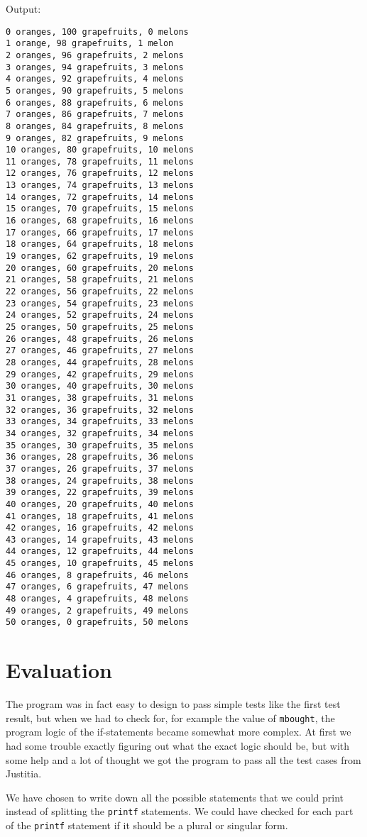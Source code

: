 \documentclass[a4paper,10pt]{article}
\begin{document}
\begin{itemize}
  Output:
\begin{lstlisting}[style = stdio]
0 oranges, 100 grapefruits, 0 melons
1 orange, 98 grapefruits, 1 melon
2 oranges, 96 grapefruits, 2 melons
3 oranges, 94 grapefruits, 3 melons
4 oranges, 92 grapefruits, 4 melons
5 oranges, 90 grapefruits, 5 melons
6 oranges, 88 grapefruits, 6 melons
7 oranges, 86 grapefruits, 7 melons
8 oranges, 84 grapefruits, 8 melons
9 oranges, 82 grapefruits, 9 melons
10 oranges, 80 grapefruits, 10 melons
11 oranges, 78 grapefruits, 11 melons
12 oranges, 76 grapefruits, 12 melons
13 oranges, 74 grapefruits, 13 melons
14 oranges, 72 grapefruits, 14 melons
15 oranges, 70 grapefruits, 15 melons
16 oranges, 68 grapefruits, 16 melons
17 oranges, 66 grapefruits, 17 melons
18 oranges, 64 grapefruits, 18 melons
19 oranges, 62 grapefruits, 19 melons
20 oranges, 60 grapefruits, 20 melons
21 oranges, 58 grapefruits, 21 melons
22 oranges, 56 grapefruits, 22 melons
23 oranges, 54 grapefruits, 23 melons
24 oranges, 52 grapefruits, 24 melons
25 oranges, 50 grapefruits, 25 melons
26 oranges, 48 grapefruits, 26 melons
27 oranges, 46 grapefruits, 27 melons
28 oranges, 44 grapefruits, 28 melons
29 oranges, 42 grapefruits, 29 melons
30 oranges, 40 grapefruits, 30 melons
31 oranges, 38 grapefruits, 31 melons
32 oranges, 36 grapefruits, 32 melons
33 oranges, 34 grapefruits, 33 melons
34 oranges, 32 grapefruits, 34 melons
35 oranges, 30 grapefruits, 35 melons
36 oranges, 28 grapefruits, 36 melons
37 oranges, 26 grapefruits, 37 melons
38 oranges, 24 grapefruits, 38 melons
39 oranges, 22 grapefruits, 39 melons
40 oranges, 20 grapefruits, 40 melons
41 oranges, 18 grapefruits, 41 melons
42 oranges, 16 grapefruits, 42 melons
43 oranges, 14 grapefruits, 43 melons
44 oranges, 12 grapefruits, 44 melons
45 oranges, 10 grapefruits, 45 melons
46 oranges, 8 grapefruits, 46 melons
47 oranges, 6 grapefruits, 47 melons
48 oranges, 4 grapefruits, 48 melons
49 oranges, 2 grapefruits, 49 melons
50 oranges, 0 grapefruits, 50 melons
\end{lstlisting}

\end{itemize}

\section{Evaluation}
The program was in fact easy to design to pass simple tests like the first test result, but when we had to check for, for example the value of {\tt mbought}, the program logic of the if-statements became somewhat more complex. At first we had some trouble exactly figuring out what the exact logic should be, but with some help and a lot of thought we got the program to pass all the test cases from Justitia. 

We have chosen to write down all the possible statements that we could print instead of splitting the {\tt printf} statements. We could have checked for each part of the {\tt printf} statement if it should be a plural or singular form. 
\end{document}
